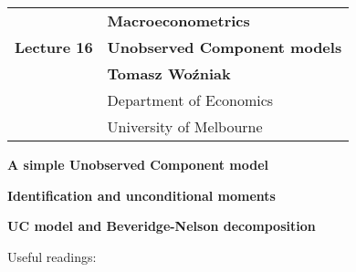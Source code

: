 \documentclass[notes,blackandwhite,mathsans,usenames,dvipsnames]{beamer}
\begin{document}







{
\begin{frame}

\vspace{1cm}
\begin{tabular}{rl}
&\textbf{\LARGE\color{mcxs2} Macroeconometrics}\\[8ex]
\textbf{\Large\color{mcxs2}Lecture 16}&\textbf{\Large\color{mcxs1}Unobserved Component models}\\[19ex]
&\textbf{Tomasz Wo\'zniak}\\[1ex]
&{\small\color{mcxs1} Department of Economics}\\
&{\small\color{mcxs1}University of Melbourne}
\end{tabular}

\end{frame}
}




{
\begin{frame}

\vspace{1cm}\textbf{\color{mcxs1}A simple Unobserved Component model}

\bigskip\textbf{\color{lightgray}Identification and unconditional moments}

\bigskip\textbf{\color{mcxs1}UC model and Beveridge-Nelson decomposition}


\vspace{1cm} Useful readings: \small


\end{frame}
}
\end{document}

